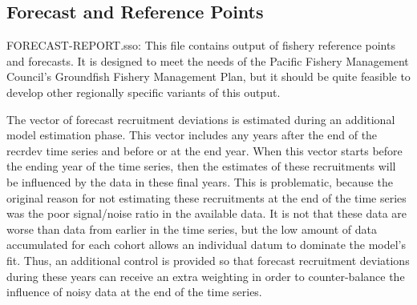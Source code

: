 \subsection{Forecast and Reference Points}
FORECAST-REPORT.sso:  This file contains output of fishery reference points and forecasts.  It is designed to meet the needs of the Pacific Fishery Management Council’s Groundfish Fishery Management Plan, but it should be quite feasible to develop other regionally specific variants of this output.

The vector of forecast recruitment deviations is estimated during an additional model estimation phase.  This vector includes any years after the end of the recrdev time series and before or at the end year.  When this vector starts before the ending year of the time series, then the estimates of these recruitments will be influenced by the data in these final years.  This is problematic, because the original reason for not estimating these recruitments at the end of the time series was the poor signal/noise ratio in the available data.  It is not that these data are worse than data from earlier in the time series, but the low amount of data accumulated for each cohort allows an individual datum to dominate the model’s fit.  Thus, an additional control is provided so that forecast recruitment deviations during these years can receive an extra weighting in order to counter-balance the influence of noisy data at the end of the time series.

